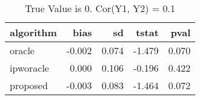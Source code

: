 \begin{table}[h!]

\caption{True Value is 0. Cor(Y1, Y2) = 0.1}
\centering
\begin{tabular}[t]{lrrrr}
\toprule
algorithm & bias & sd & tstat & pval\\
\midrule
oracle & -0.002 & 0.074 & -1.479 & 0.070\\
ipworacle & 0.000 & 0.106 & -0.196 & 0.422\\
proposed & -0.003 & 0.083 & -1.464 & 0.072\\
\bottomrule
\end{tabular}
\end{table}
